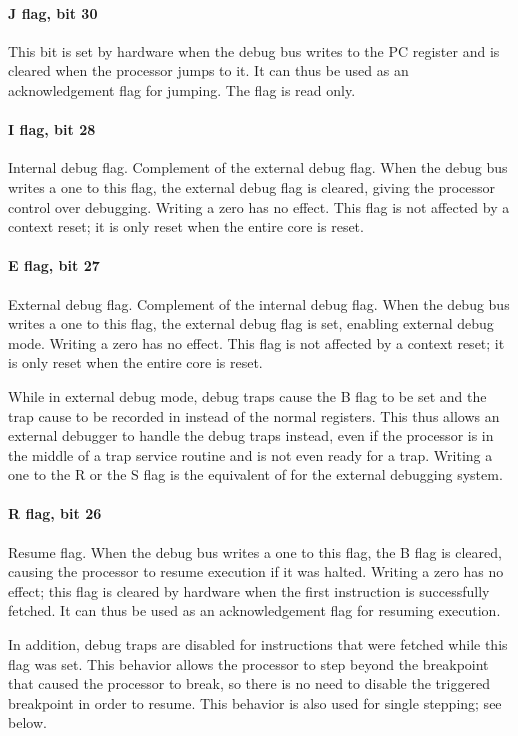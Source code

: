 \paragraph*{J flag, bit 30}
This bit is set by hardware when the debug bus writes to the PC register and is
cleared when the processor jumps to it. It can thus be used as an acknowledgement
flag for jumping. The flag is read only.
\paragraph*{I flag, bit 28}
Internal debug flag. Complement of the external debug flag. When the debug bus
writes a one to this flag, the external debug flag is cleared, giving the
processor control over debugging. Writing a zero has no effect. This flag is not
affected by a context reset; it is only reset when the entire core is reset.
\paragraph*{E flag, bit 27}
External debug flag. Complement of the internal debug flag. When the debug bus
writes a one to this flag, the external debug flag is set, enabling external
debug mode. Writing a zero has no effect. This flag is not affected by a context
reset; it is only reset when the entire core is reset.

While in external debug mode, debug traps cause the B flag to be set and the
trap cause to be recorded in  instead of the normal registers. This
thus allows an external debugger to handle the debug traps instead, even if the
processor is in the middle of a trap service routine and is not even ready for a
trap. Writing a one to the R or the S flag is the equivalent of  for
the external debugging system.
\paragraph*{R flag, bit 26}
Resume flag. When the debug bus writes a one to this flag, the B flag is
cleared, causing the processor to resume execution if it was halted. Writing a
zero has no effect; this flag is cleared by hardware when the first instruction
is successfully fetched. It can thus be used as an acknowledgement flag for
resuming execution.

In addition, debug traps are disabled for instructions that were fetched while
this flag was set. This behavior allows the processor to step beyond the
breakpoint that caused the processor to break, so there is no need to disable
the triggered breakpoint in order to resume. This behavior is also used for
single stepping; see below.
